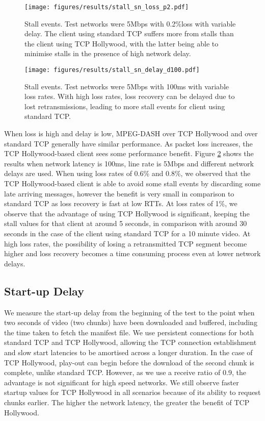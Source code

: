 \begin{figure}
  \centering
  \texttt{[image: figures/results/stall\_sn\_loss\_p2.pdf]}
  \caption{Stall events. Test networks were 5Mbps with 0.2\%loss with variable delay. The 
           client using standard TCP suffers more from stalls than the client using TCP Hollywood, 
           with the latter being able to minimise stalls in the presence of high network delay.}
  \label{fig:stall_delay2}
\end{figure}

\begin{figure}
  \centering
  \texttt{[image: figures/results/stall\_sn\_delay\_d100.pdf]}
  \caption{Stall events. Test networks were 5Mbps with 100ms with variable loss rates. With 
           high loss rates, loss recovery can be delayed due to lost retransmissions, leading 
           to more stall events for client using standard TCP.}
  \label{fig:stall_loss}
\end{figure}

When loss is high and delay is low, MPEG-DASH over TCP Hollywood and over standard TCP 
generally have similar performance. As packet loss increases, the TCP Hollywood-based 
client sees some performance benefit. Figure
\ref{fig:stall_loss} shows the results when network latency is 100ms, line rate is 5Mbps
and different network delays are used. When using loss rates of 0.6\% and 0.8\%, we
observed that the TCP Hollywood-based client is able to avoid some stall events by discarding 
some late arriving messages, however the benefit is very small in comparison to standard TCP 
as loss recovery is fast at low RTTs. At loss rates of 1\%, we observe that the advantage 
of using TCP Hollywood is significant, keeping the stall values for that client at around 5
seconds, in comparison with around 30 seconds in the case of the client using standard TCP 
for a 10 minute video. At high loss rates, the possibility of losing a retransmitted TCP 
segment become higher and loss recovery becomes a time consuming process even at lower 
network delays. 

\subsection{Start-up Delay}
We measure the start-up delay from the beginning of the test to the point when two seconds of
video (two chunks) have been downloaded and buffered, including the time taken to fetch the manifest
file. We use persistent connections for both standard TCP and TCP Hollywood, allowing the
TCP connection establishment and slow start latencies to be amortised across a longer
duration. In the case of TCP Hollywood, play-out can begin before the download of the
second chunk is complete, unlike standard TCP. However, as we use a receive ratio of 0.9,
the advantage is not significant for high speed networks. We still observe faster startup
values for TCP Hollywood in all scenarios because of its ability to request chunks
earlier. The higher the network latency, the greater the benefit of TCP Hollywood.

